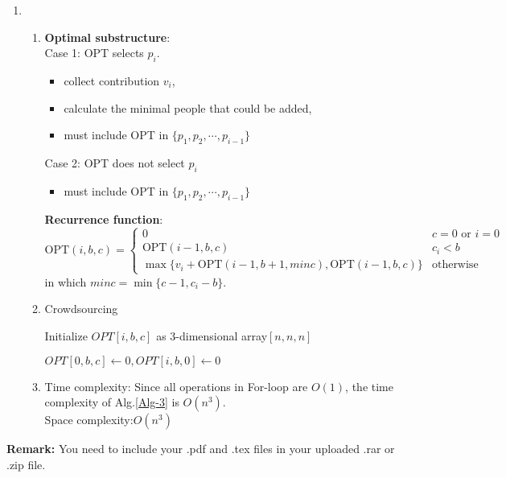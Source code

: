 \documentclass[12pt,a4paper]{article}
\makeatletter
\newtheorem*{solution}{Solution}
\theoremstyle{definition}
\renewenvironment{solution}[1][Solution] {\par\pushQED{\qed}\normalfont\topsep6\p@\@plus6\p@\relax\trivlist\item[\hskip\labelsep\bfseries#1\@addpunct{.}]\ignorespaces}{\popQED\endtrivlist\@endpefalse} \makeatother
\makeatother
\begin{document}
\begin{enumerate}
	\begin{solution}
		\begin{enumerate}
			\item \textbf{Optimal substructure}:\\
			Case 1: OPT selects $ p_i $.
			\begin{itemize}
				\item collect contribution $ v_i $, 
				\item calculate the minimal people that could be added,
				\item must include OPT in $ \{p_1, p_2, \cdots, p_{i-1}\} $
			\end{itemize}
			Case 2: OPT does not select $ p_i $
			\begin{itemize}
				\item must include OPT in $ \{p_1, p_2, \cdots, p_{i-1}\} $
			\end{itemize}
			\textbf{Recurrence function}:
			$$\text{OPT}(i, b, c)= 
			\begin{cases}
			0 &c=0\text{ or }i=0\\
			\text{OPT}(i-1,b,c) &c_i<b\\
			\max \{v_i+\text{OPT}(i-1,b+1,minc),\text{OPT}(i-1,b,c)\} &\text{otherwise}
			\end{cases}
			$$
			in which $ minc=\min\{c-1,c_i-b\} $.
			\item
			\begin{minipage}[t]{0.89\textwidth}
				\begin{algorithm}[H]
					\BlankLine
					\caption{Crowdsourcing}
					\label{Alg-3}
					
					Initialize $ OPT[i,b,c] $ as 3-dimensional array$ [n,n,n] $\;
					
					$OPT[0,b,c]\leftarrow0,OPT[i,b,0]\leftarrow0 $\;
					
					
					\;
					
				\end{algorithm}
			\end{minipage}
			\item Time complexity: Since all operations in For-loop are $ O(1) $, the time complexity of Alg.\ref{Alg-3} is $ O(n^3) $.\\
			Space complexity:$  O(n^3) $
		\end{enumerate}
	\end{solution}

\end{enumerate}

\vspace{20pt}

\textbf{Remark:} You need to include your .pdf and .tex files in your uploaded .rar or .zip file.

\end{document}
